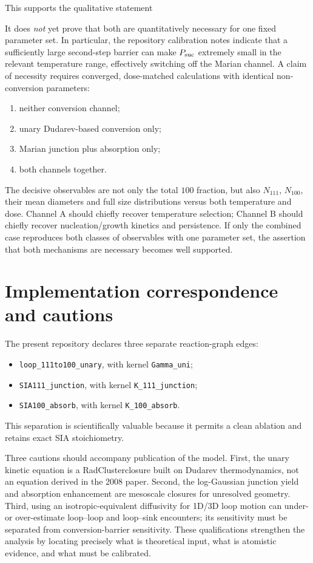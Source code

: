 \documentclass[11pt,a4paper]{article}
\newcommand{\rc}{\textsf{RadCluster}}
\newcommand{\code}[1]{\texttt{#1}}
\begin{document}
This supports the qualitative statement
\begin{center}
\end{center}
It does \emph{not} yet prove that both are quantitatively necessary for one fixed parameter set.  In particular, the repository calibration notes indicate that a sufficiently large second-step barrier can make $P_{\rm suc}$ extremely small in the relevant temperature range, effectively switching off the Marian channel.  A claim of necessity requires converged, dose-matched calculations with identical non-conversion parameters:
\begin{enumerate}
 \item neither conversion channel;
 \item unary Dudarev-based conversion only;
 \item Marian junction plus absorption only;
 \item both channels together.
\end{enumerate}
The decisive observables are not only the total $100$ fraction, but also $N_{111}$, $N_{100}$, their mean diameters and full size distributions versus both temperature and dose.  Channel A should chiefly recover temperature selection; Channel B should chiefly recover nucleation/growth kinetics and persistence.  If only the combined case reproduces both classes of observables with one parameter set, the assertion that both mechanisms are necessary becomes well supported.

\section{Implementation correspondence and cautions}

The present repository declares three separate reaction-graph edges:
\begin{itemize}
\item \code{loop\_111to100\_unary}, with kernel \code{Gamma\_uni};
\item \code{SIA111\_junction}, with kernel \code{K\_111\_junction};
\item \code{SIA100\_absorb}, with kernel \code{K\_100\_absorb}.
\end{itemize}
This separation is scientifically valuable because it permits a clean ablation and retains exact SIA stoichiometry.

Three cautions should accompany publication of the model.  First, the unary kinetic equation is a \rc closure built on Dudarev thermodynamics, not an equation derived in the 2008 paper.  Second, the log-Gaussian junction yield and absorption enhancement are mesoscale closures for unresolved geometry.  Third, using an isotropic-equivalent diffusivity for 1D/3D loop motion can under- or over-estimate loop--loop and loop--sink encounters; its sensitivity must be separated from conversion-barrier sensitivity.  These qualifications strengthen the analysis by locating precisely what is theoretical input, what is atomistic evidence, and what must be calibrated.
\end{document}
